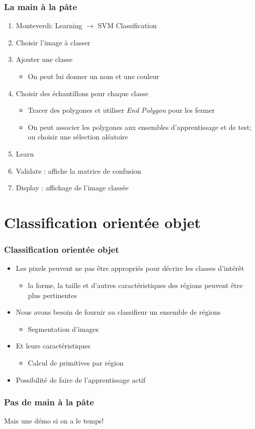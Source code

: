 \documentclass[compress]{beamer}
\begin{document}
\begin{frame}
  \frametitle{La main à la pâte}
  \begin{enumerate}
  \item Monteverdi: Learning $\rightarrow$ SVM Classification
  \item Choisir l'image à classer
  \item Ajouter une classe
    \begin{itemize}
    \item On peut lui donner un nom et une couleur
    \end{itemize}
  \item Choisir des échantillons pour chaque classe
    \begin{itemize}
    \item Tracer des polygones et utiliser {\em End Polygon} pour les fermer
    \item On peut associer les polygones aux ensembles d'apprentissage
      et de test; ou choisir une sélection aléatoire
    \end{itemize}
  \item Learn
  \item Validate : affiche la matrice de confusion
  \item Display : affichage de l'image classée
  \end{enumerate}    
\end{frame}

\section[Orienté objet]{Classification orientée objet}
\label{sec:objectoriented}
\begin{frame}
  \frametitle{Classification orientée objet}
  \begin{itemize}
  \item Les pixels peuvent ne pas être appropriés pour décrire les
    classes d'intérêt
    \begin{itemize}
    \item la forme, la taille et d'autres caractéristiques des régions
      peuvent être plus pertinentes
    \end{itemize}
  \item Nous avons besoin de fournir au classifieur un ensemble de régions
    \begin{itemize}
    \item Segmentation d'images
    \end{itemize}
  \item Et leurs caractéristiques
    \begin{itemize}
    \item Calcul de primitives par région
    \end{itemize}
  \item Possibilité de faire de l'apprentissage actif
  \end{itemize}
\end{frame}

\begin{frame}
  \frametitle{Pas de main à la pâte}
Mais une démo si on a le temps!
\end{frame}
\end{document}
